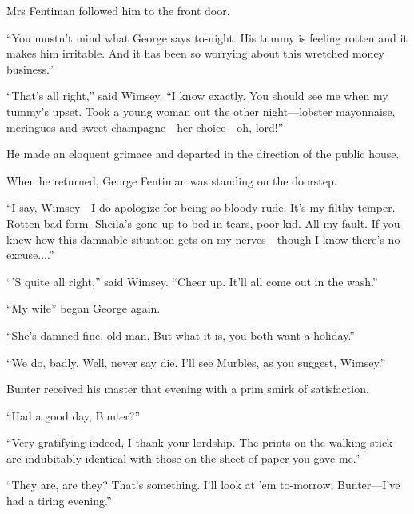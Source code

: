 Mrs Fentiman followed him to the front door.

\enquote{You mustn't mind what George says to-night. His tummy is feeling rotten and it makes him irritable. And it has been so worrying about this wretched money business.}

\enquote{That's all right,} said Wimsey. \enquote{I know exactly. You should see me when my tummy's upset. Took a young woman out the other night\allowbreak---\allowbreak lobster mayonnaise, meringues and sweet champagne\allowbreak---\allowbreak her choice\allowbreak---\allowbreak oh, lord!}

He made an eloquent grimace and departed in the direction of the public house.

When he returned, George Fentiman was standing on the doorstep.

\enquote{I say, Wimsey\allowbreak---\allowbreak I do apologize for being so bloody rude. It's my filthy temper. Rotten bad form. Sheila's gone up to bed in tears, poor kid. All my fault. If you knew how this damnable situation gets on my nerves\allowbreak---\allowbreak though I know there's no excuse....}

\enquote{'S quite all right,} said Wimsey. \enquote{Cheer up. It'll all come out in the wash.}

\enquote{My wife\longdash} began George again.

\enquote{She's damned fine, old man. But what it is, you both want a holiday.}

\enquote{We do, badly. Well, never say die. I'll see Murbles, as you suggest, Wimsey.}

Bunter received his master that evening with a prim smirk of satisfaction.

\enquote{Had a good day, Bunter?}

\enquote{Very gratifying indeed, I thank your lordship. The prints on the walking-stick are indubitably identical with those on the sheet of paper you gave me.}

\enquote{They are, are they? That's something. I'll look at 'em to-morrow, Bunter\allowbreak---\allowbreak I've had a tiring evening.}